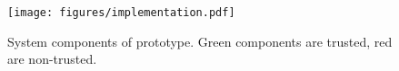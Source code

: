 \begin{figure}[t]
	\centering
	\texttt{[image: figures/implementation.pdf]}
	\caption{\label{fig:secndp-impl} System components of \project{} prototype. Green components are trusted, red are non-trusted.}
\end{figure}

\fi